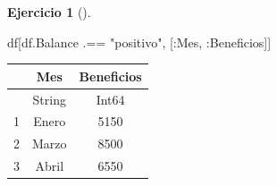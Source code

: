 \documentclass[
  a4paper,
]{scrreport}
\newenvironment{Shaded}{\begin{snugshade}}{\end{snugshade}}
\newcommand{\NormalTok}[1]{\textcolor[rgb]{0.00,0.23,0.31}{#1}}
\newcommand{\OperatorTok}[1]{\textcolor[rgb]{0.37,0.37,0.37}{#1}}
\newcommand{\StringTok}[1]{\textcolor[rgb]{0.13,0.47,0.30}{#1}}
\theoremstyle{definition}
\newtheorem{exercise}{Ejercicio}[chapter]
\theoremstyle{remark}
\begin{document}
\begin{exercise}[]
\begin{enumerate}
\begin{tcolorbox}
\begin{Shaded}
\begin{Highlighting}[]
\NormalTok{df[df.Balance }\OperatorTok{.==} \StringTok{"positivo"}\NormalTok{, [}\OperatorTok{:}\NormalTok{Mes, }\OperatorTok{:}\NormalTok{Beneficios]]}
\end{Highlighting}
\end{Shaded}

  \begin{tabular}{r|cc}
      & Mes & Beneficios\\
      \hline
      & String & Int64\\
      \hline
      1 & Enero & 5150 \\
      2 & Marzo & 8500 \\
      3 & Abril & 6550 \\
  \end{tabular}

  \end{tcolorbox}
\end{enumerate}

\end{exercise}
\end{document}
